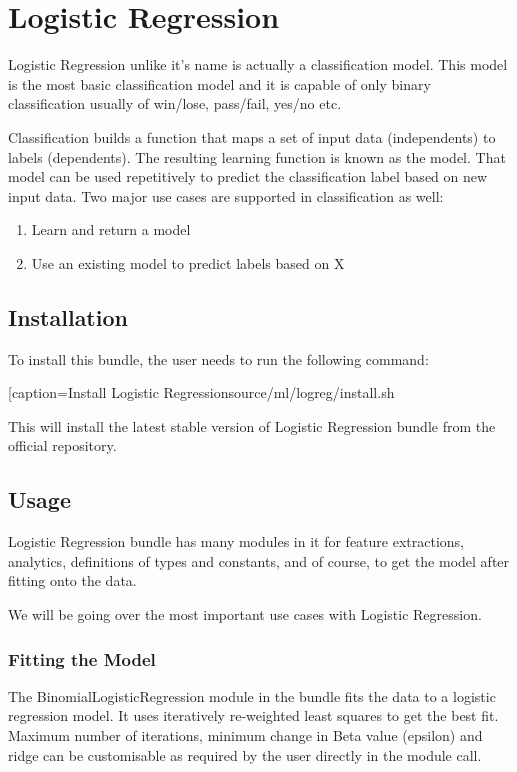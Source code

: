 \chapter{Logistic Regression}\label{supe:logreg}

Logistic Regression unlike it's name is actually a classification model. This model is the most basic classification model and it is capable of only binary classification usually of win/lose, pass/fail, yes/no etc.

Classification builds a function that maps a set of input data (independents) to labels (dependents). The resulting learning function is known as the model. That model can be used repetitively to predict the classification label based on new input data. Two major use cases are supported in classification as well:

\begin{enumerate}
    \item Learn and return a model
    \item Use an existing model to predict labels based on X
\end{enumerate}

\section{Installation}

To install this bundle, the user needs to run the following command:

[caption=Install Logistic Regression{source/ml/logreg/install.sh}

This will install the latest stable version of Logistic Regression bundle from the official repository.

\section{Usage}

Logistic Regression bundle has many modules in it for feature extractions, analytics, definitions of types and constants, and of course, to get the model after fitting onto the data.

We will be going over the most important use cases with Logistic Regression.

\subsection{Fitting the Model}

The BinomialLogisticRegression module in the bundle fits the data to a logistic regression model. It uses iteratively re-weighted least squares to get the best fit. Maximum number of iterations, minimum change in Beta value (epsilon) and ridge can be customisable as required by the user directly in the module call.

